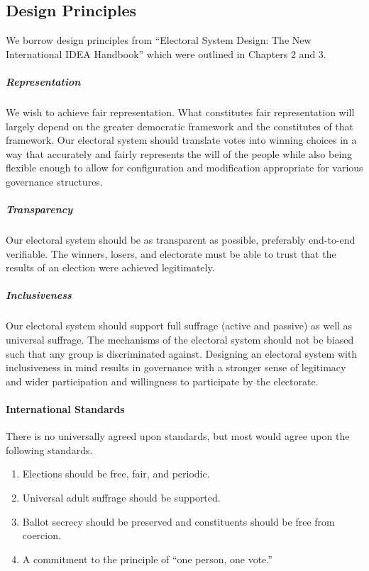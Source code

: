 \subsection{Design Principles}


We borrow design principles from ``Electoral System Design: The New
International IDEA Handbook'' which were outlined in Chapters 2 and 3.

\subparagraph{Representation} We wish to achieve fair representation. What
constitutes fair representation will largely depend on the greater democratic
framework and the constitutes of that framework. Our electoral system should
translate votes into winning choices in a way that accurately and fairly
represents the will of the people while also being flexible enough to allow for
configuration and modification appropriate for various governance structures.

\subparagraph{Transparency} Our electoral system should be as transparent as
possible, preferably end-to-end verifiable. The winners, losers, and electorate
must be able to trust that the results of an election were achieved
legitimately.

\subparagraph{Inclusiveness} Our electoral system should support full suffrage
(active and passive) as well as universal suffrage. The mechanisms of the
electoral system should not be biased such that any group is discriminated
against. Designing an electoral system with inclusiveness in mind results in
governance with a stronger sense of legitimacy and wider participation and
willingness to participate by the electorate.

\paragraph{International Standards} There is no universally agreed upon
standards, but most would agree upon the following standards.

\begin{enumerate}[label=\Large$\square$]
  \item Elections should be free, fair, and periodic.
  \item Universal adult suffrage should be supported.
  \item Ballot secrecy should be preserved and constituents should be free
    from coercion.
  \item A commitment to the principle of ``one person, one vote.''
\end{enumerate}

